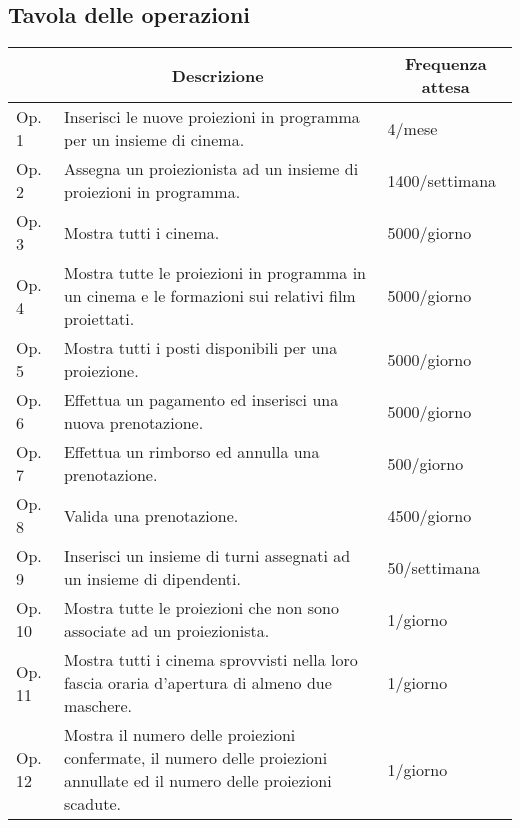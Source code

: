 \subsection*{Tavola delle operazioni}
%
%
\begin{tabularx}{\linewidth}{|l|X|X|}
    \hline
    \rowcolor{tblhdrcolor}
    \multicolumn{1}{|c|}{\textbf{Cod.}}
     & \multicolumn{1}{|c|}{\textbf{Descrizione}}
     & \multicolumn{1}{|c|}{\textbf{Frequenza attesa}}
    \\ \hline
    Op. 1
     & Inserisci le nuove proiezioni in programma per un insieme di cinema.
     & 4/mese
    \\ \hline
    Op. 2
     & Assegna un proiezionista ad un insieme di proiezioni in programma.
     & 1400/settimana
    \\ \hline
    Op. 3
     & Mostra tutti i cinema.
     & 5000/giorno
    \\ \hline
    Op. 4
     & Mostra tutte le proiezioni in programma in un cinema e le formazioni
    sui relativi film proiettati.
     & 5000/giorno
    \\ \hline
    Op. 5
     & Mostra tutti i posti disponibili per una proiezione.
     & 5000/giorno
    \\ \hline
    Op. 6
     & Effettua un pagamento ed inserisci una nuova prenotazione.
     & 5000/giorno
    \\ \hline
    Op. 7
     & Effettua un rimborso ed annulla una prenotazione.
     & 500/giorno
    \\ \hline
    Op. 8
     & Valida una prenotazione.
     & 4500/giorno
    \\ \hline
    Op. 9
     & Inserisci un insieme di turni assegnati ad un insieme di dipendenti.
     & 50/settimana
    \\ \hline
    Op. 10
     & Mostra tutte le proiezioni che non sono associate ad un proiezionista.
     & 1/giorno
    \\ \hline
    Op. 11
     & Mostra tutti i cinema sprovvisti nella loro fascia oraria d'apertura di
    almeno due maschere.
     & 1/giorno
    \\ \hline
    Op. 12
     & Mostra il numero delle proiezioni confermate, il numero delle proiezioni
    annullate ed il numero delle proiezioni scadute.
     & 1/giorno
    \\ \hline
\end{tabularx}

